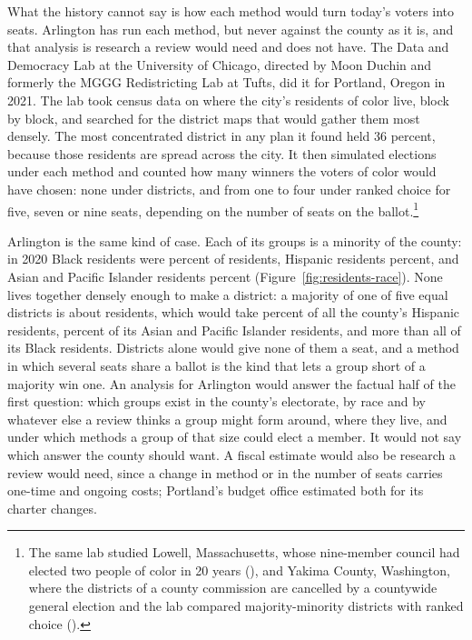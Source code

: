 What the history cannot say is how each method would turn today's voters into
seats. Arlington has run each method, but never against the county as it is, and
that analysis is research a review would need and does not have. The Data and
Democracy Lab at the University of Chicago, directed by Moon Duchin and formerly the
MGGG Redistricting Lab at Tufts,\autocite{ddl2026about} did it for Portland, Oregon
in 2021.\autocite[1]{mggg2021portland} The lab took census data on where the city's
residents of color live, block by block, and searched for the district maps that
would gather them most densely. The most concentrated district in any plan it found
held 36 percent, because those residents are spread across the
city.\autocite[4--5]{mggg2021portland} It then simulated elections under each
method and counted how many winners the voters of color would have chosen: none
under districts, and from one to four under ranked choice for five, seven or nine
seats, depending on the number of seats on the
ballot.\autocite[18]{mggg2021portland}\footnote{The same lab studied Lowell,
Massachusetts, whose nine-member council had elected two people of color in 20
years (\cite{ddl2019lowell}), and Yakima County, Washington, where the districts of
a county commission are cancelled by a countywide general election and the lab
compared majority-minority districts with ranked choice
(\cite[1, 6]{mggg2020yakima}).}

Arlington is the same kind of case. Each of its groups is a minority of the county:
in 2020 Black residents were \groupShareBlackTwoThousandTwenty{} percent of
residents, Hispanic residents \groupShareHispanicTwoThousandTwenty{} percent, and
Asian and Pacific Islander residents \groupShareAsianTwoThousandTwenty{} percent
(Figure~\ref{fig:residents-race}). None lives together densely enough to make a
district: a majority of one of five equal districts is about
\districtMajorityTwoThousandTwenty{} residents, which would take
\districtNeedHispanicTwoThousandTwenty{} percent of all the county's Hispanic
residents, \districtNeedAsianTwoThousandTwenty{} percent of its Asian and Pacific
Islander residents, and more than all of its Black residents. Districts alone would
give none of them a seat, and a method in which several seats share a ballot is the
kind that lets a group short of a majority win one. An analysis for Arlington would
answer the factual half of the first question: which groups exist in the county's
electorate, by race and by whatever else a review thinks a group might form
around, where they live, and under which methods a group of that size could elect a
member. It would not say which answer the county should want. A fiscal estimate
would also be research a review would need, since a change in method or in the number
of seats carries one-time and ongoing costs; Portland's budget office estimated
both for its charter changes.\autocite[18--20]{portland2022pr6}

